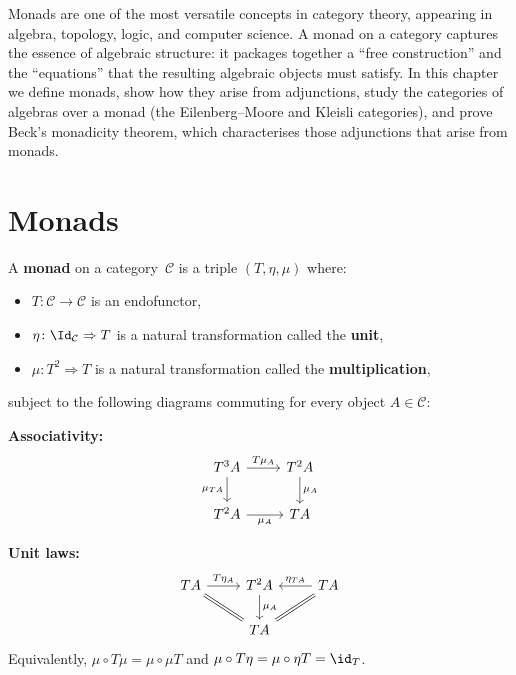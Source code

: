 \vspace{1em}

Monads are one of the most versatile concepts in category theory,
appearing in algebra, topology, logic, and computer science.
A monad on a category captures the essence of algebraic structure:
it packages together a ``free construction'' and the ``equations''
that the resulting algebraic objects must satisfy.
In this chapter we define monads, show how they arise from adjunctions,
study the categories of algebras over a monad (the Eilenberg--Moore and
Kleisli categories), and prove Beck's monadicity theorem, which
characterises those adjunctions that arise from monads.


\section{Monads}\label{sec:monad-def}

\begin{definition}[Monad]\label{def:monad}
A \textbf{monad} on a category~$\mathcal{C}$ is a triple
$(T,\eta,\mu)$ where:
\begin{itemize}
\item $T\colon\mathcal{C}\to\mathcal{C}$ is an endofunctor,
\item $\eta\colon\Id_{\mathcal{C}}\Rightarrow T$ is a natural
    transformation called the \textbf{unit},
\item $\mu\colon T^2\Rightarrow T$ is a natural transformation called
    the \textbf{multiplication},
\end{itemize}
subject to the following diagrams commuting for every object
$A\in\mathcal{C}$:

\textbf{Associativity:}
\[
\begin{tikzcd}
T^3A \arrow[r, "T\mu_A"] \arrow[d, "\mu_{TA}"'] &
T^2A \arrow[d, "\mu_A"] \\
T^2A \arrow[r, "\mu_A"'] &
TA
\end{tikzcd}
\]

\textbf{Unit laws:}
\[
\begin{tikzcd}
TA \arrow[r, "T\eta_A"] \arrow[dr, equal] &
T^2A \arrow[d, "\mu_A"] &
TA \arrow[l, "\eta_{TA}"'] \arrow[dl, equal] \\
& TA &
\end{tikzcd}
\]
Equivalently, $\mu\circ T\mu = \mu\circ\mu T$ and
$\mu\circ T\eta = \mu\circ\eta T = \id_T$.
\end{definition}

